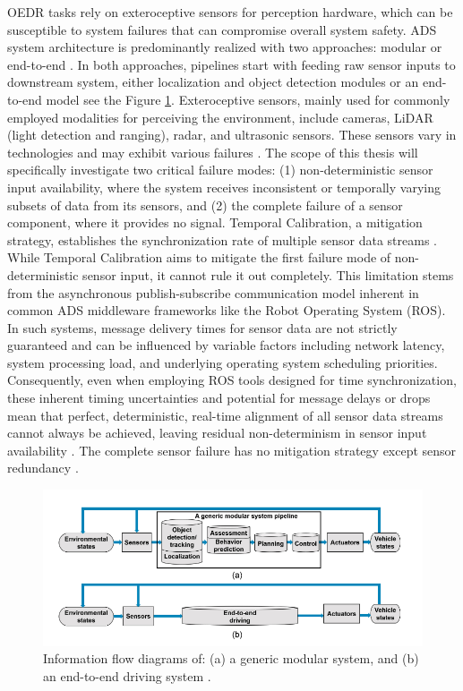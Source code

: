 OEDR tasks rely on exteroceptive sensors for perception hardware, which can be susceptible to system failures that can compromise overall system safety. ADS system architecture is predominantly realized with two approaches: modular or end-to-end \cite{yurtseverSurveyAutonomousDriving2020}. In both approaches, pipelines start with feeding raw sensor inputs to downstream system, either localization and object detection modules or an end-to-end model see the Figure \ref{fig:figure_background_ads_system_architecture}. Exteroceptive sensors, mainly used for commonly employed modalities for perceiving the environment, include cameras, LiDAR (light detection and ranging), radar, and ultrasonic sensors. These sensors vary in technologies and may exhibit various failures \cite{matosSurveySensorFailures2024}. The scope of this thesis will specifically investigate two critical failure modes: (1) non-deterministic sensor input availability, where the system receives inconsistent or temporally varying subsets of data from its sensors, and (2) the complete failure of a sensor component, where it provides no signal. Temporal Calibration, a mitigation strategy, establishes the synchronization rate of multiple sensor data streams \cite{matosSurveySensorFailures2024}. While Temporal Calibration aims to mitigate the first failure mode of non-deterministic sensor input, it cannot rule it out completely. This limitation stems from the asynchronous publish-subscribe communication model inherent in common ADS middleware frameworks like the Robot Operating System (ROS). In such systems, message delivery times for sensor data are not strictly guaranteed and can be influenced by variable factors including network latency, system processing load, and underlying operating system scheduling priorities. Consequently, even when employing ROS tools designed for time synchronization, these inherent timing uncertainties and potential for message delays or drops mean that perfect, deterministic, real-time alignment of all sensor data streams cannot always be achieved, leaving residual non-determinism in sensor input availability \cite{parkRealTimeCharacteristicsROS2020}. The complete sensor failure has no mitigation strategy except sensor redundancy \cite{matosSurveySensorFailures2024}.

\begin{figure}
    \centering
    \includegraphics[width=\textwidth]{figures/figure_background_ads_system_architecture.png}
    \caption{Information flow diagrams of: (a) a generic modular system, and (b) an end-to-end driving system \cite{yurtseverSurveyAutonomousDriving2020}.}
    \label{fig:figure_background_ads_system_architecture}
\end{figure}

